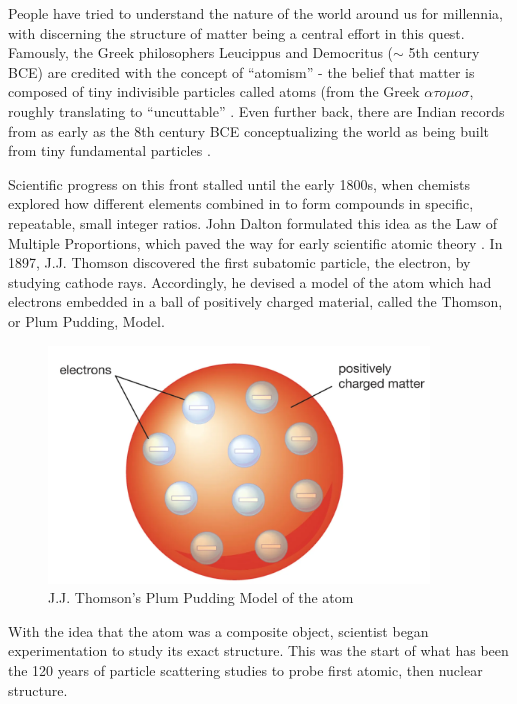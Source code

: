
People have tried to understand the nature of the world around us for millennia, with discerning the structure of matter being a central effort in this quest. Famously, the Greek philosophers Leucippus and Democritus ($\sim$ 5th century BCE) are credited with the concept of ``atomism'' - the belief that matter is composed of tiny indivisible particles called atoms (from the Greek $\alpha \tau o \mu o \sigma$, roughly translating to ``uncuttable'' \cite{C.C.W.Taylor1999Commentary}. Even further back, there are Indian records from as early as the 8th century BCE conceptualizing the world as being built from tiny fundamental particles \cite{ThomasMcEvilley2002THePhilosophies}.

Scientific progress on this front stalled until the early 1800s, when chemists explored how different elements combined in to form compounds in specific, repeatable, small integer ratios. John Dalton formulated this idea as the Law of Multiple Proportions, which paved the way for early scientific atomic theory \cite{Britannica2010LawProportions}. In 1897, J.J. Thomson discovered the first subatomic particle, the electron, by studying cathode rays\cite{Thomson1901OnAtoms}. Accordingly, he devised a model of the atom which had electrons embedded in a ball of positively charged material, called the Thomson, or Plum Pudding, Model\cite{JaumeNavarro1995AThomson}.

\begin{figure}
    \centering
    \includegraphics[width=0.9\textwidth]{Chapters/Ch1-Intro/Ch1-Sec1-Background/pics/plumbpudding.png}
    \caption{J.J. Thomson's Plum Pudding Model of the atom \cite{Britannica2023ThomsonModel} }
    \label{fig:PlumPudding}
\end{figure}

With the idea that the atom was a composite object, scientist began experimentation to study its exact structure. This was the start of what has been the 120 years of particle scattering studies to probe first atomic, then nuclear structure. 

